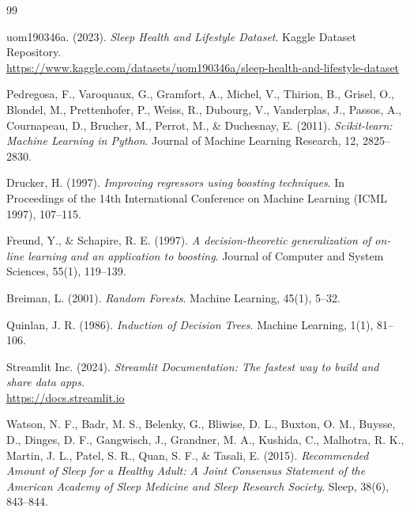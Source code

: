 \documentclass[12pt,a4paper]{article}
\begin{document}
\newpage
\begin{thebibliography}{99}

uom190346a. (2023). \textit{Sleep Health and Lifestyle Dataset}. Kaggle Dataset Repository. \\
\url{https://www.kaggle.com/datasets/uom190346a/sleep-health-and-lifestyle-dataset}

Pedregosa, F., Varoquaux, G., Gramfort, A., Michel, V., Thirion, B., Grisel, O., Blondel, M., Prettenhofer, P., Weiss, R., Dubourg, V., Vanderplas, J., Passos, A., Cournapeau, D., Brucher, M., Perrot, M., \& Duchesnay, E. (2011). \textit{Scikit-learn: Machine Learning in Python}. Journal of Machine Learning Research, 12, 2825--2830.

Drucker, H. (1997). \textit{Improving regressors using boosting techniques}. In Proceedings of the 14th International Conference on Machine Learning (ICML 1997), 107--115.

Freund, Y., \& Schapire, R. E. (1997). \textit{A decision-theoretic generalization of on-line learning and an application to boosting}. Journal of Computer and System Sciences, 55(1), 119--139.

Breiman, L. (2001). \textit{Random Forests}. Machine Learning, 45(1), 5--32.

Quinlan, J. R. (1986). \textit{Induction of Decision Trees}. Machine Learning, 1(1), 81--106.

Streamlit Inc. (2024). \textit{Streamlit Documentation: The fastest way to build and share data apps}. \\
\url{https://docs.streamlit.io}

Watson, N. F., Badr, M. S., Belenky, G., Bliwise, D. L., Buxton, O. M., Buysse, D., Dinges, D. F., Gangwisch, J., Grandner, M. A., Kushida, C., Malhotra, R. K., Martin, J. L., Patel, S. R., Quan, S. F., \& Tasali, E. (2015). \textit{Recommended Amount of Sleep for a Healthy Adult: A Joint Consensus Statement of the American Academy of Sleep Medicine and Sleep Research Society}. Sleep, 38(6), 843--844.

\end{thebibliography}
\end{document}
